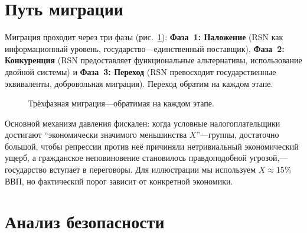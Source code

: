 \documentclass[11pt,a4paper,twocolumn]{article}
\begin{document}
\section{Путь миграции}

Миграция проходит через три фазы (рис.~\ref{fig:migration}): \textbf{Фаза~1: Наложение} (RSN как информационный уровень, государство---единственный поставщик), \textbf{Фаза~2: Конкуренция} (RSN предоставляет функциональные альтернативы, использование двойной системы) и \textbf{Фаза~3: Переход} (RSN превосходит государственные эквиваленты, добровольная миграция). Переход обратим на каждом этапе.

\begin{figure}[ht]
\centering
{}
\caption{Трёхфазная миграция---обратимая на каждом этапе.}
\label{fig:migration}
\end{figure}

Основной механизм давления фискален: когда условные налогоплательщики достигают ``экономически значимого меньшинства $X$''---группы, достаточно большой, чтобы репрессии против неё причиняли нетривиальный экономический ущерб, а гражданское неповиновение становилось правдоподобной угрозой,---государство вступает в переговоры. Для иллюстрации мы используем $X \approx 15\%$ ВВП, но фактический порог зависит от конкретной экономики.

\section{Анализ безопасности}
\end{document}
